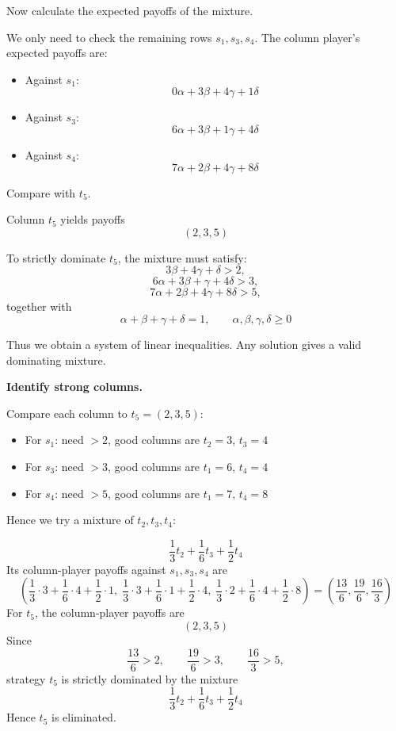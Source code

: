 Now calculate the expected payoffs of the mixture.

We only need to check the remaining rows \(s_1, s_3, s_4\).
The column player's expected payoffs are:

\begin{itemize}
\item Against \(s_1\):
\[
0\alpha + 3\beta + 4\gamma + 1\delta
\]

\item Against \(s_3\):
\[
6\alpha + 3\beta + 1\gamma + 4\delta
\]

\item Against \(s_4\):
\[
7\alpha + 2\beta + 4\gamma + 8\delta
\]
\end{itemize}

Compare with \(t_5\).

Column \(t_5\) yields payoffs
\[
(2,3,5)
\]

To strictly dominate \(t_5\), the mixture must satisfy:
\[
3\beta + 4\gamma + \delta > 2,
\]
\[
6\alpha + 3\beta + \gamma + 4\delta > 3,
\]
\[
7\alpha + 2\beta + 4\gamma + 8\delta > 5,
\]
together with
\[
\alpha + \beta + \gamma + \delta = 1,
\qquad
\alpha, \beta, \gamma, \delta \ge 0
\]

Thus we obtain a system of linear inequalities. Any solution gives a valid dominating mixture.

\textbf{Identify strong columns.}

Compare each column to \(t_5 = (2,3,5)\):

\begin{itemize}
\item For \(s_1\): need \(>2\), good columns are \(t_2 = 3\), \(t_3 = 4\)
\item For \(s_3\): need \(>3\), good columns are \(t_1 = 6\), \(t_4 = 4\)
\item For \(s_4\): need \(>5\), good columns are \(t_1 = 7\), \(t_4 = 8\)
\end{itemize}

Hence we try a mixture of \(t_2, t_3, t_4\):

\[
\frac13 t_2+\frac16 t_3+\frac12 t_4
\]
Its column-player payoffs against \(s_1,s_3,s_4\) are
\[
\left(\frac13\cdot 3+\frac16\cdot 4+\frac12\cdot 1,\;
\frac13\cdot 3+\frac16\cdot 1+\frac12\cdot 4,\;
\frac13\cdot 2+\frac16\cdot 4+\frac12\cdot 8\right)
=
\left(\frac{13}{6},\frac{19}{6},\frac{16}{3}\right)
\]
For \(t_5\), the column-player payoffs are
\[
(2,3,5)
\]
Since
\[
\frac{13}{6}>2,\qquad \frac{19}{6}>3,\qquad \frac{16}{3}>5,
\]
strategy \(t_5\) is strictly dominated by the mixture
\[
\frac13 t_2+\frac16 t_3+\frac12 t_4
\]
Hence \(t_5\) is eliminated.

